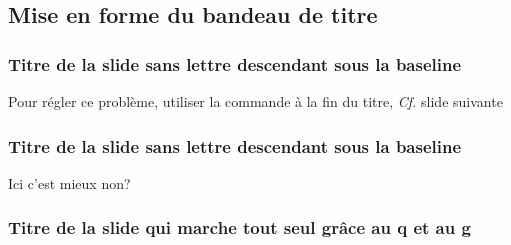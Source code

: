 \subsection{Mise en forme du bandeau de titre}
\begin{frame}
\frametitle{Titre de la slide sans lettre descendant sous la baseline}
	Pour régler ce problème, utiliser la commande \lin{\esp} à la fin du titre, \textit{Cf.} slide suivante
\end{frame}


\begin{frame}
\frametitle{Titre de la slide sans lettre descendant sous la baseline\esp}
	Ici c'est mieux non?
\end{frame}


\begin{frame}[fragile]
\frametitle{Titre de la slide qui marche tout seul grâce au q et au g}
\end{frame}

